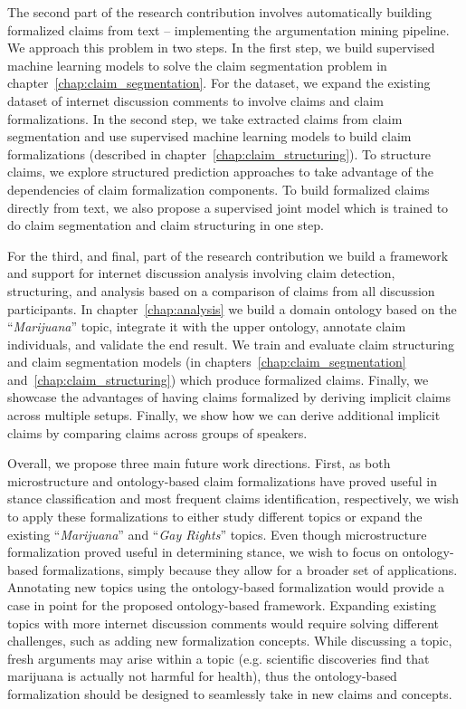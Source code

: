 The second part of the research contribution involves automatically building
formalized claims from text -- implementing the argumentation mining pipeline. 
We approach this problem in two steps.  In the first step, we build supervised
machine learning models to solve the claim segmentation problem in
chapter~\ref{chap:claim_segmentation}.  For the dataset, we expand the existing
dataset of internet discussion comments \citep{hasan2014you} to involve claims
and claim formalizations.  In the second step, we take extracted claims from
claim segmentation and use supervised machine learning models to build claim
formalizations (described in chapter~\ref{chap:claim_structuring}). To
structure claims, we explore structured prediction approaches to take advantage
of the dependencies of claim formalization components.  To build formalized
claims directly from text, we also propose a supervised joint model which is
trained to do claim segmentation and claim structuring in one step. 

For the third, and final, part of the research contribution we build a framework
and support for internet discussion analysis involving claim detection,
structuring, and analysis based on a comparison of claims from all discussion
participants. In chapter~\ref{chap:analysis} we build a domain ontology based
on the ``\emph{Marijuana}'' topic, integrate it with the upper ontology,
annotate claim individuals, and validate the end result. We train and
evaluate claim structuring and claim segmentation models (in
chapters~\ref{chap:claim_segmentation} and~\ref{chap:claim_structuring}) which
produce formalized claims. Finally, we showcase the advantages of having claims
formalized by deriving implicit claims across multiple setups. 
Finally, we show how we can derive additional implicit claims by comparing
claims across groups of speakers. 

Overall, we propose three main future work directions.  First, as both
microstructure and ontology-based claim formalizations have proved useful in stance
classification and most frequent claims identification, respectively, we wish to
apply these formalizations to either study different topics or expand the existing
``\emph{Marijuana}'' and ``\emph{Gay Rights}'' topics.  Even though
microstructure formalization proved useful in determining stance, we wish to focus
on ontology-based formalizations, simply because they allow for a broader set
of applications. Annotating new topics using the ontology-based formalization
would provide a case in point for the proposed ontology-based framework.
Expanding existing topics with more internet discussion comments would require
solving different challenges, such as adding new formalization concepts. While
discussing a topic, fresh arguments may arise within a topic (e.g. scientific
discoveries find that marijuana is actually not harmful for
health), thus the ontology-based formalization should be designed to seamlessly take in
new claims and concepts. 

